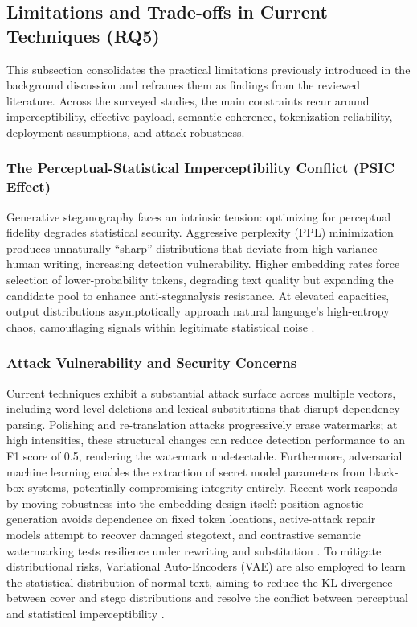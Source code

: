 \subsection{Limitations and Trade-offs in Current Techniques (RQ5)}
\label{subsec:rq5}

This subsection consolidates the practical limitations previously introduced in the background discussion and reframes them as findings from the reviewed literature. Across the surveyed studies, the main constraints recur around imperceptibility, effective payload, semantic coherence, tokenization reliability, deployment assumptions, and attack robustness.

\subsubsection{The Perceptual-Statistical Imperceptibility Conflict (PSIC Effect)}

Generative steganography faces an intrinsic tension: optimizing for perceptual fidelity degrades statistical security. Aggressive perplexity (PPL) minimization produces unnaturally ``sharp'' distributions that deviate from high-variance human writing, increasing detection vulnerability. Higher embedding rates force selection of lower-probability tokens, degrading text quality but expanding the candidate pool to enhance anti-steganalysis resistance. At elevated capacities, output distributions asymptotically approach natural language's high-entropy chaos, camouflaging signals within legitimate statistical noise \cite{yang2020vae}.

\subsubsection{Attack Vulnerability and Security Concerns}

Current techniques exhibit a substantial attack surface across multiple vectors, including word-level deletions and lexical substitutions that disrupt dependency parsing. Polishing and re-translation attacks progressively erase watermarks; at high intensities, these structural changes can reduce detection performance to an F1 score of 0.5, rendering the watermark undetectable. Furthermore, adversarial machine learning enables the extraction of secret model parameters from black-box systems, potentially compromising integrity entirely. Recent work responds by moving robustness into the embedding design itself: position-agnostic generation avoids dependence on fixed token locations, active-attack repair models attempt to recover damaged stegotext, and contrastive semantic watermarking tests resilience under rewriting and substitution \cite{lin2025positionagnostic,chen2025activetwo,wang2025contrastive}. To mitigate distributional risks, Variational Auto-Encoders (VAE) are also employed to learn the statistical distribution of normal text, aiming to reduce the KL divergence between cover and stego distributions and resolve the conflict between perceptual and statistical imperceptibility \cite{hao2025robust}.

